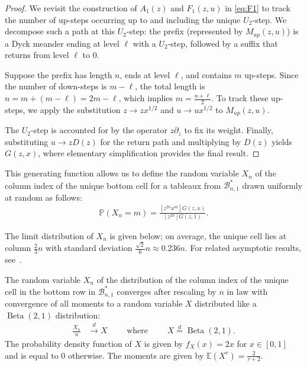 \documentclass[a4paper,UKenglish,cleveref, autoref, thm-restate]{lipics-v2021}
\newcommand{\Bc}{\mathcal{B}}
\newcommand{\E}{\mathbb{E}}
\begin{document}
\begin{proof}
    We revisit the construction of $A_1(z)$ and $F_1(z,u)$ in \eqref{eq:F1} to track the number of up-steps occurring up to and including the unique $U_2$-step. We decompose such a path at this $U_2$-step: the prefix (represented by $M_{up}(z,u)$) is a Dyck meander ending at level $\ell$ with a $U_2$-step, followed by a suffix that returns from level $\ell$ to $0$.

    Suppose the prefix has length $n$, ends at level $\ell$, and contains $m$ up-steps. Since the number of down-steps is $m-\ell$, the total length is $n = m + (m-\ell) = 2m-\ell$, which implies $m = \frac{n+\ell}{2}$. To track these up-steps, we apply the substitution $z \to zx^{1/2}$ and $u \to ux^{1/2}$ to $M_{up}(z,u)$. 

    The $U_2$-step is accounted for by the operator $z \partial_z$ to fix its weight. Finally, substituting $u \to zD(z)$ for the return path and multiplying by $D(z)$ yields $G(z,x)$, where elementary simplification provides the final result.
\end{proof}

This generating function allows us to define the random variable $X_n$ of the column index of the unique bottom cell for a tableaux from $\Bc^*_{n,1}$ drawn uniformly at random as follows:
\begin{align*}
    \mathbb{P}(X_n=m) = \frac{[z^{2n} x^m]G(z,x)}{[z^{2n}]G(z,1)}.
\end{align*}

The limit distribution of $X_n$ is given below; on average, the unique cell lies at column $\frac{2}{3}n$ with standard deviation $\frac{\sqrt{2}}{6} n \approx 0.236 n$. For related asymptotic results, see~\cite{Durand2004,Banderieretal2012Nongaussian}.

\begin{theorem}
    The random variable $X_n$ of the distribution of the column index of the unique cell in the bottom row in $\mathcal{B}^*_{n,1}$ converges after rescaling by $n$ in law with convergence of all moments to a random variable $X$ distributed like a $\operatorname{Beta}(2,1)$ distribution:
    \begin{align*}
        \frac{X_n}{n} &\stackrel{d}{\to} X  \qquad \text{ where } \qquad
        X \stackrel{d}{=}\operatorname{Beta}(2,1).
    \end{align*}
    The probability density function of $X$ is given by $f_X(x) = 2x$ for $x \in [0,1]$ and is equal to $0$ otherwise. 
    The moments are given by $\E(X^r) = \frac{2}{r+2}$.
\end{theorem}
\end{document}
